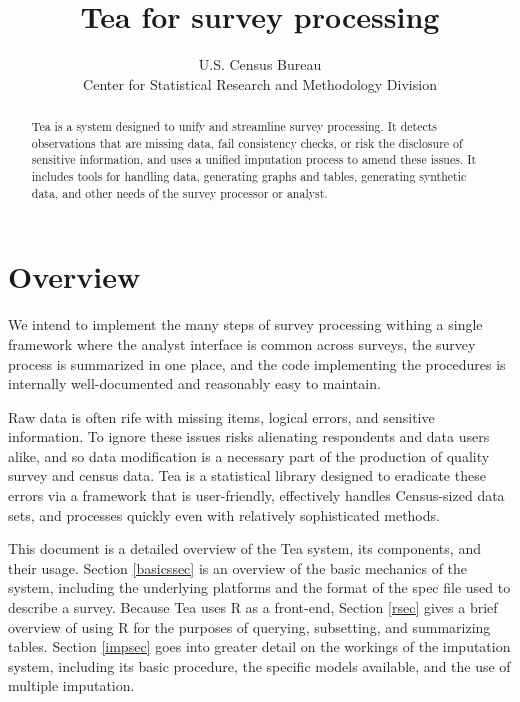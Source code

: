 \documentclass{article}
\begin{document}
\author{U.S. Census Bureau\\Center for Statistical Research and Methodology Division}
\title{Tea for survey processing}
\maketitle

\begin{abstract}
Tea is a system designed to unify and streamline survey processing.  It detects
observations that are missing data, fail consistency checks, or risk the disclosure
of sensitive information, and uses a unified imputation process to amend these issues.
It includes tools for handling data, generating graphs and tables, generating synthetic
data, and other needs of the survey processor or analyst.
\end{abstract}

\section{Overview}
{\sc We intend} to implement the many steps of survey processing withing a single
framework where the analyst interface is common across surveys, the survey process
is summarized in one place, and the code implementing the procedures is internally
well-documented and reasonably easy to maintain.

Raw data is often rife with missing items, logical errors, and sensitive information.
To ignore these issues risks alienating respondents and data users alike, and so data
modification is a necessary part of the production of quality survey and census data.
Tea is a statistical library designed to eradicate these errors via a framework
that is user-friendly, effectively handles Census-sized data sets, and processes
quickly even with relatively sophisticated methods.

This document is a detailed overview of the Tea system, its components, and their usage.
Section \ref{basicssec} is an overview of the basic mechanics of the system, including the
underlying platforms and the format of the spec file used to describe a survey.
Because Tea uses R as a front-end, Section \ref{rsec} gives a brief overview of using R
for the purposes of querying, subsetting, and summarizing tables.
Section \ref{impsec} goes into greater detail on the workings of the imputation system,
including its basic procedure, the specific models available, and the use of multiple imputation.
\end{document}
